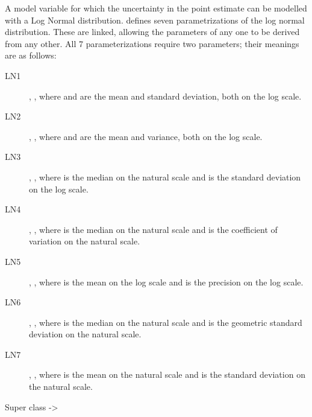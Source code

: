 \documentclass[a4paper]{book}
\begin{document}
\begin{Details}\relax
A model variable for which the uncertainty in the point estimate can
be modelled with a Log Normal distribution. 
defines seven parametrizations of the log normal distribution. These are linked,
allowing the parameters of any one to be derived from any other. All
7 parameterizations require two parameters; their meanings are as follows:
\begin{description}

\item[LN1] , , where \eqn{\mu}{} and \eqn{\sigma}{} are the mean
and standard deviation, both on the log scale.
\item[LN2] , , where \eqn{\mu}{} and  are the mean
and variance, both on the log scale.
\item[LN3] , , where  is the median on the natural
scale and \eqn{\sigma}{} is the standard deviation on the log scale.
\item[LN4] , , where  is the median on the natural
scale and  is the coefficient of variation on the natural scale.
\item[LN5] , , where \eqn{\mu}{} is the mean on the log
scale and \eqn{\tau}{} is the precision on the log scale.
\item[LN6] , , where  is the median on
the natural scale and  is the geometric standard deviation on the
natural scale.
\item[LN7] , , where  is the mean on
the natural scale and  is the standard deviation on the
natural scale.

\end{description}

\end{Details}
%
\begin{Section}{Super class}
 -> 
\end{Section}
%
\end{document}
